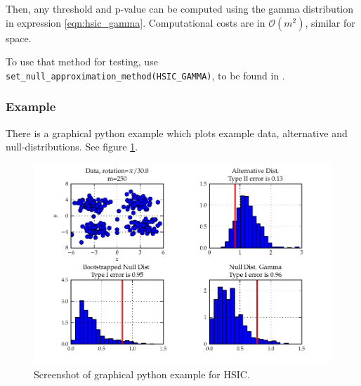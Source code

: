 Then, any threshold and p-value can be computed using the gamma distribution in expression \ref{eqn:hsic_gamma}. Computational costs are in $\mathcal{O}(m^2)$, similar for space.

To use that method for testing, use \texttt{set\_null\_approximation\_method(HSIC\_GAMMA)}, to be found in .


\subsubsection{Example}
There is a graphical python example which plots example data, alternative and null-distributions. See figure \ref{fig:statistical_testing-hsic}.

\begin{figure}\centering
		\includegraphics{fig/statistical_testing/hsic}
		\caption{Screenshot of graphical python example for HSIC.}
		\label{fig:statistical_testing-hsic}
\end{figure}